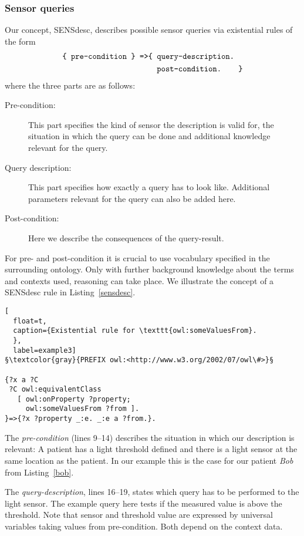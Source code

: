 \subsubsection{Sensor queries}
Our concept, SENSdesc, describes possible sensor queries via existential rules of the form
\begin{align*}
 \texttt{\{ pre-condition \} =>} &\texttt{\{ query-description.}\\&\texttt{\quad post-condition.\qquad\}} 
\end{align*}
where the three parts are as follows:
\begin{description}
\item[Pre-condition:] This part specifies the kind of sensor the description is valid for, the situation in which the query can be done and  
additional knowledge relevant for the query.
\item[Query description:] This part specifies how exactly a query has to look like. 
Additional parameters relevant for the query can also be added here.
\item[Post-condition:] Here we describe the consequences of the query-result. 
\end{description}
For pre- and post-condition it is crucial to use vocabulary specified in the surrounding ontology. Only with further background knowledge about the terms 
and contexts used, reasoning can take place. 
We illustrate the concept of a SENSdesc rule in Listing~\ref{sensdesc}.
\begin{lstlisting}[
  float=t,
  caption={Existential rule for \texttt{owl:someValuesFrom}. 
  },
  label=example3]
§\textcolor{gray}{PREFIX owl:<http://www.w3.org/2002/07/owl\#>}§
  
{?x a ?C
 ?C owl:equivalentClass 
   [ owl:onProperty ?property; 
     owl:someValuesFrom ?from ].
}=>{?x ?property _:e. _:e a ?from.}.
\end{lstlisting}

The \emph{pre-condition} (lines 9--14) describes the situation in which our description is relevant: 
A patient has a light threshold defined %
and there is a light sensor at the same location as the patient. In our example this is the case for our patient \emph{Bob} from Listing~\ref{bob}.

The \emph{query-description}, lines 16--19, states which query has to be performed to the light sensor. The example query here tests if the measured value 
is above the threshold.
Note that sensor and threshold value
are expressed by universal variables taking values from pre-condition. Both depend on the context data.

